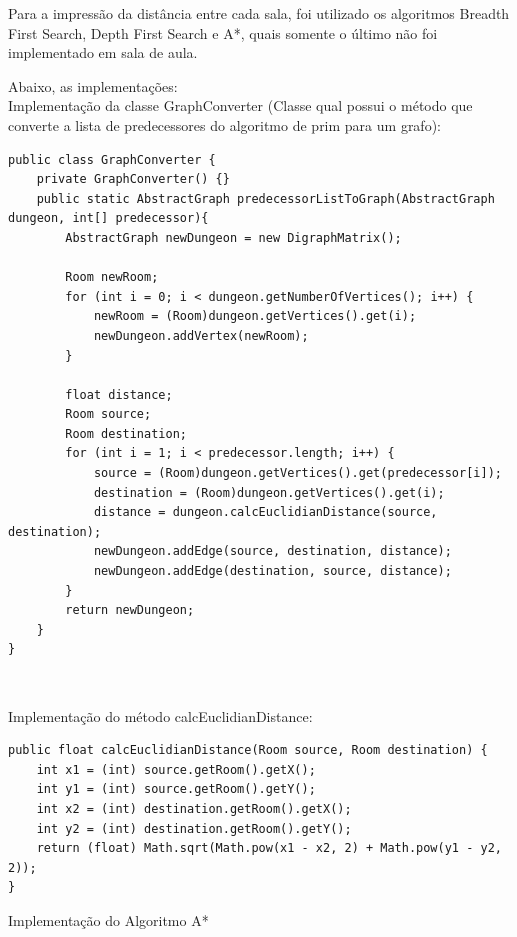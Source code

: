 \documentclass[a4paper, 12pt]{article}
\begin{document}
Para a impressão da distância entre cada sala, foi utilizado os algoritmos Breadth First Search, Depth First Search e A*, quais somente o último não foi implementado em sala de aula.

Abaixo, as implementações:\\

Implementação da classe GraphConverter (Classe qual possui o método que converte a lista de predecessores do algoritmo de prim para um grafo):


\begin{verbatim}
public class GraphConverter {
    private GraphConverter() {}
    public static AbstractGraph predecessorListToGraph(AbstractGraph dungeon, int[] predecessor){
        AbstractGraph newDungeon = new DigraphMatrix();

        Room newRoom;
        for (int i = 0; i < dungeon.getNumberOfVertices(); i++) {
            newRoom = (Room)dungeon.getVertices().get(i);
            newDungeon.addVertex(newRoom);
        }

        float distance;
        Room source;
        Room destination;
        for (int i = 1; i < predecessor.length; i++) {
            source = (Room)dungeon.getVertices().get(predecessor[i]);
            destination = (Room)dungeon.getVertices().get(i);
            distance = dungeon.calcEuclidianDistance(source, destination);
            newDungeon.addEdge(source, destination, distance);
            newDungeon.addEdge(destination, source, distance);
        }
        return newDungeon;
    }
}
\end{verbatim}


\begin{verbatim}
  
\end{verbatim}

Implementação do método calcEuclidianDistance:

\begin{verbatim}
public float calcEuclidianDistance(Room source, Room destination) {
    int x1 = (int) source.getRoom().getX();
    int y1 = (int) source.getRoom().getY();
    int x2 = (int) destination.getRoom().getX();
    int y2 = (int) destination.getRoom().getY();
    return (float) Math.sqrt(Math.pow(x1 - x2, 2) + Math.pow(y1 - y2, 2));
}
\end{verbatim}

Implementação do Algoritmo A*
\end{document}
